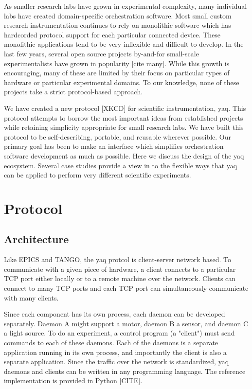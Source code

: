 \documentclass[aip, amsmath, amssymb, reprint,]{revtex4-1}
\begin{document}
As smaller research labs have grown in experimental complexity, many individual labs have created domain-specific orchestration software.
Most small custom research instrumentation continues to rely on monolithic software which has hardcorded protocol support for each particular connected device.
These monolithic applications tend to be very inflexible and difficult to develop.
In the last few years, several open source projects by-and-for small-scale experimentalists have grown in popularity [cite many].
While this growth is encouraging, many of these are limited by their focus on particular types of hardware or particular experimental domains.
To our knowledge, none of these projects take a strict protocol-based approach.

We have created a new protocol [XKCD] for scientific instrumentation, yaq.
This protocol attempts to borrow the most important ideas from established projects while retaining simplicity appropriate for small research labs.
We have built this protocol to be self-describing, portable, and reusable wherever possible.
Our primary goal has been to make an interface which simplifies orchestration software development as much as possible.
Here we discuss the design of the yaq ecosystem.
Several case studies provide a view in to the flexible ways that yaq can be applied to perform very different scientific experiments.

\section{Protocol}

\subsection{Architecture}

Like EPICS and TANGO, the yaq protcol is client-server network based.
To communicate with a given piece of hardware, a client connects to a particular TCP port either locally or to a remote machine over the network.
Clients can connect to many TCP ports and each TCP port can simultaneously communicate with many clients.

Since each component has its own process, each daemon can be developed separately.
Daemon A might support a motor, daemon B a sensor, and daemon C a light source.
To do an experiment, a control program (a "client") must send commands to each of these daemons.
Each of the daemons is a separate application running in its own process, and importantly the client is also a separate application.
Since the traffic over the network is standardized, yaq daemons and clients can be written in any programming language.
The reference implementation is provided in Python [CITE].
\end{document}
